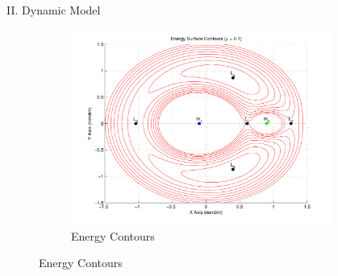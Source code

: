 \documentclass[final, usenames, dvipsnames]{beamer}
\newlength{\onecolwidth}
\newlength{\twocolwidth}
\begin{document}
\begin{frame}[t]
\begin{columns}[T,onlytextwidth]
\begin{column}{\onecolwidth}
\begin{block}{II. Dynamic Model}
\begin{figure}
\begin{subfigure}[b]{0.45\columnwidth}
			 \includegraphics[width = \columnwidth]{energy_contours}
			\caption*{Energy Contours\label{fig:energy_contours}}
		\end{subfigure}
	\end{figure}
\end{block} %
\end{column}  %

\begin{column}{\twocolwidth} %


\end{column}
\end{columns}
\end{frame}
\end{document}
